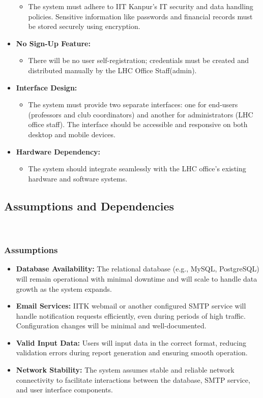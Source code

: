 \documentclass[a4paper,12pt]{article}
\begin{document}
\begin{itemize}
\begin{itemize}
        \item The system must adhere to IIT Kanpur’s IT security and data handling policies. Sensitive information like passwords and financial records must be stored securely using encryption.
    \end{itemize}
    \item \textbf{No Sign-Up Feature:}
    \begin{itemize}
        \item There will be no user self-registration; credentials must be created and distributed manually by the LHC Office Staff(admin).
    \end{itemize}
    \item \textbf{Interface Design:}
    \begin{itemize}
        \item The system must provide two separate interfaces: one for end-users (professors and club coordinators) and another for administrators (LHC office staff).
The interface should be accessible and responsive on both desktop and mobile devices.
    \end{itemize}
    \item \textbf{Hardware Dependency:}
    \begin{itemize}
        \item The system should integrate seamlessly with the LHC office's existing hardware and software systems.
    \end{itemize}
\end{itemize}

\newpage

\subsection{Assumptions and Dependencies} \\\label{subsec:assump_and_dependencies}
\subsubsection{Assumptions}
    \begin{itemize}
        \item \textbf{Database Availability:} The relational database (e.g., MySQL, PostgreSQL) will remain operational with minimal downtime and will scale to handle data growth as the system expands.
        \item \textbf{Email Services:} IITK webmail or another configured SMTP service will handle notification requests efficiently, even during periods of high traffic. Configuration changes will be minimal and well-documented.
        \item \textbf{Valid Input Data:} Users will input data in the correct format, reducing validation errors during report generation and ensuring smooth operation.
        \item \textbf{Network Stability:} The system assumes stable and reliable network connectivity to facilitate interactions between the database, SMTP service, and user interface components.
    \end{itemize}
\end{document}
